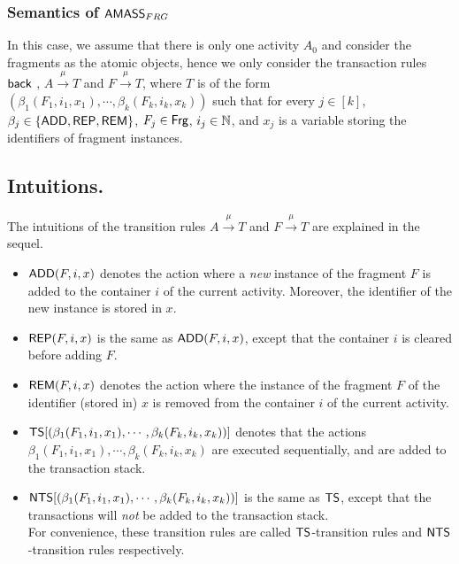 
\subsubsection{Semantics of $\textsf{AMASS}_{FRG}$}\label{sec-foamass}
In this case, we assume that there is only one activity $A_0$ and consider the fragments as the atomic objects, hence we only consider the transaction rules ${\mathsf{back} }$ , $A\xrightarrow{\mu}T$ and $F\xrightarrow{\mu}T$, where $T$ is of the form $(\beta_1(F_1, i_1, x_1), \cdots, \beta_k(F_k, i_k, x_k))$ such that for every $j \in [k]$, $\beta_j \in \{\mathsf{ADD}, \mathsf{REP}, \mathsf{REM}\}$, $F_j \in {\sf Frg}$, $i_j \in {\mathbb{N} }$, and $x_j$ is a variable storing the identifiers of fragment instances.

\subsection*{Intuitions.}
The intuitions of the transition rules  $A\xrightarrow{\mu}T$ and $F\xrightarrow{\mu}T$ are explained in the sequel. 
\begin{itemize}
	\item 
	$\mathsf{ADD}(F, i,  x)$ denotes the action where a \emph{new} instance of the fragment $F$ is added to the container $i$ of the current activity. Moreover, the identifier of the new instance is stored in $x$.
	
	\item $\mathsf{REP}(F, i,  x)$ is the same as $\mathsf{ADD}(F, i,  x)$, except that the container %
	$i$ is cleared before adding $F$. 
%
	\item $\mathsf{REM}(F, i,  x)$ denotes the action where the instance of the fragment $F$ of the identifier (stored in) $x$ is removed from the container $i$ of the current activity.	 
	
\item ${\sf TS}[(\beta_1(F_1, i_1, x_1), \cdots, \beta_k(F_k, i_k, x_k))]$ denotes that the actions $\beta_1(F_1, i_1, x_1),\cdots, \beta_k(F_k, i_k, x_k)$ are executed sequentially, and %
	are added to the transaction stack. 
\item ${\sf NTS}[(\beta_1(F_1, i_1, x_1), \cdots, \beta_k(F_k, i_k, x_k))]$ is the same as ${\sf TS}$, except that %
	the transactions will \emph{not} be added to the transaction stack. \\
	For convenience, these transition rules are called ${\sf TS}$-transition rules and ${\sf NTS}$-transition rules respectively.
\end{itemize}


